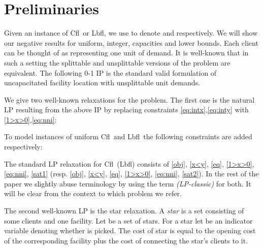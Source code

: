 \documentclass[11pt]{article}\usepackage{amsmath}
\newcommand{\lbfl}{{\sc Lbfl}}
\newcommand{\cfl}{{\sc Cfl}}
\begin{document}
\iffalse 


\section{Preliminaries}
\label{sec:prel}

\iffalse -------- removed, they are already in the intro --------
In an  instance  of the  general lower bounded-capacitated facility  location problem
(\lbfl\/, \cfl\/)   we  are  given a  set of  facilities
 and a set of clients  in some metric space.
Each  facility  has  an opening  cost   and a capacity  (\cfl\/) or a
bound  (\lbfl\/). We seek to open some facilities of 
and assign the demand  of each client 
to some opened facilities (we allow splittable demands).  
The cost for serving a unit of demand of client  by an open facility  is
, 
where    is  the distance  between    and
. As mentioned, distances  satisfy the triangle inequality. Moreover each
open facility  must serve at most
 in a \cfl\ instance or at least  total demand in a \lbfl\/.Our
objective  is to  minimize the  total facility  opening cost  plus the
total service cost. We use  to denote  and 
respectively.
-------------- \fi


Given an instance  of \cfl\ or \lbfl, we use  to denote  and 
respectively.
We will show our negative results for uniform, integer, capacities and lower
bounds. Each client can be thought of as representing one unit of demand.
 It  is  well-known  that in such a setting  the  splittable  and
unsplittable versions  of the problem are equivalent. 
The following 0-1  IP is the standard  valid formulation of uncapacitated 
facility location with unsplittable unit demands.

We give two well-known relaxations  for the problem.  The first one is the
natural  LP resulting from the above IP by replacing constraints
\eqref{eq:intx},\eqref{eq:inty} with \eqref{1>x>0},\eqref{eq:nni}: 
 
To model instances of uniform \cfl\ and \lbfl\ the following constraints are added
respectively:
 
The standard LP relaxation for \cfl\ (\lbfl) consists of \eqref{obj},  \eqref{x<y}, \eqref{eq},
 \eqref{1>x>0}, \eqref{eq:nni}, \eqref{sat1}  (resp. \eqref{obj}, \eqref{x<y}, \eqref{eq},
 \eqref{1>x>0}, \eqref{eq:nni}, \eqref{sat2}). 
In the rest of the paper we slightly abuse terminology by 
using  the term {\em (LP-classic)} for both. It will be clear from the context to
which problem we refer. 

The second well-known LP  is the star relaxation. 
A {\em star} is a set consisting of some  clients and
one facility. Let  be a set of stars. For a star   let   be an indicator variable denoting
whether   is picked.   The cost   of star    is equal
to the opening cost of the corresponding facility plus the cost of
connecting the star's clients to it. 
 
\end{document}
